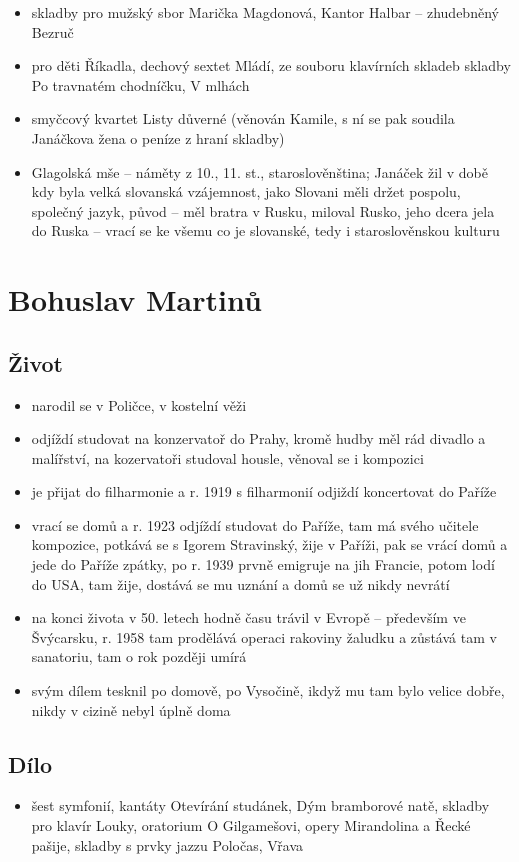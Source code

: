 \documentclass{article}
\begin{document}
\begin{itemize}
  \item skladby pro mužský sbor Marička Magdonová, Kantor Halbar -- zhudebněný Bezruč
  \item pro děti Říkadla, dechový sextet Mládí, ze souboru klavírních skladeb skladby Po travnatém chodníčku, V mlhách
  \item smyčcový kvartet Listy důverné (věnován Kamile, s ní se pak soudila Janáčkova žena o peníze z hraní skladby)
  \item Glagolská mše -- náměty z 10., 11. st., staroslověnština; Janáček žil v době kdy byla velká slovanská vzájemnost, jako Slovani měli držet pospolu, společný jazyk, původ -- měl bratra v Rusku, miloval Rusko, jeho dcera jela do Ruska -- vrací se ke všemu co je slovanské, tedy i staroslověnskou kulturu
\end{itemize}

\section{Bohuslav Martinů}
\subsection{Život}
\begin{itemize}
  \item narodil se v Poličce, v kostelní věži
  \item odjíždí studovat na konzervatoř do Prahy, kromě hudby měl rád divadlo a malířství, na kozervatoři studoval housle, věnoval se i kompozici
  \item je přijat do filharmonie a r. 1919 s filharmonií odjiždí koncertovat do Paříže
  \item vrací se domů a r. 1923 odjíždí studovat do Paříže, tam má svého učitele kompozice, potkává se s Igorem Stravinský, žije v Paříži, pak se vrácí domů a jede do Paříže zpátky, po r. 1939 prvně emigruje na jih Francie, potom lodí do USA, tam žije, dostává se mu uznání a domů se už nikdy nevrátí
  \item na konci života v 50. letech hodně času trávil v Evropě -- především ve Švýcarsku, r. 1958 tam prodělává operaci rakoviny žaludku a zůstává tam v sanatoriu, tam o rok později umírá
  \item svým dílem tesknil po domově, po Vysočině, ikdyž mu tam bylo velice dobře, nikdy v cizině nebyl úplně doma
\end{itemize}
\subsection{Dílo}
\begin{itemize}
  \item šest symfonií, kantáty Otevírání studánek, Dým bramborové natě, skladby pro klavír Louky, oratorium O Gilgamešovi, opery Mirandolina a Řecké pašije, skladby s prvky jazzu Poločas, Vřava
\end{itemize}
\end{document}
